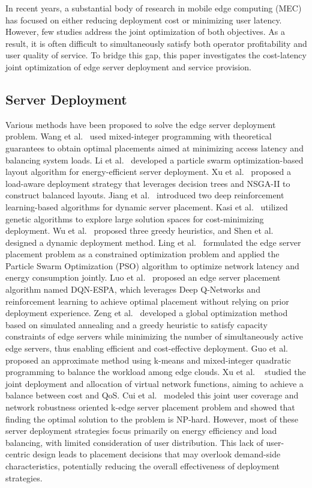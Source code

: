 \documentclass[10pt, conference, letterpaper]{IEEEtran}
\begin{document}
In recent years, a substantial body of research in mobile edge computing (MEC) has focused on either reducing deployment cost or minimizing user latency. However, few studies address the joint optimization of both objectives. As a result, it is often difficult to simultaneously satisfy both operator profitability and user quality of service. To bridge this gap, this paper investigates the cost-latency joint optimization of edge server deployment and service provision.

\subsection{Server Deployment}
Various methods have been proposed to solve the edge server deployment problem. Wang et al.~\cite{b1} used mixed-integer programming with theoretical guarantees to obtain optimal placements aimed at minimizing access latency and balancing system loads. Li et al.~\cite{b2} developed a particle swarm optimization-based layout algorithm for energy-efficient server deployment. Xu et al.~\cite{b3} proposed a load-aware deployment strategy that leverages decision trees and NSGA-II to construct balanced layouts. Jiang et al.~\cite{b4} introduced two deep reinforcement learning-based algorithms for dynamic server placement. Kasi et al.~\cite{b5} utilized genetic algorithms to explore large solution spaces for cost-minimizing deployment. Wu et al.~\cite{b6} proposed three greedy heuristics, and Shen et al.~\cite{b7} designed a dynamic deployment method. Ling et al.~\cite{b8} formulated the edge server placement problem as a constrained optimization problem and applied the Particle Swarm Optimization (PSO) algorithm to optimize network latency and energy consumption jointly. Luo et al.~\cite{b9} proposed an edge server placement algorithm named DQN-ESPA, which leverages Deep Q-Networks and reinforcement learning to achieve optimal placement without relying on prior deployment experience. Zeng et al.~\cite{b10} developed a global optimization method based on simulated annealing and a greedy heuristic to satisfy capacity constraints of edge servers while minimizing the number of simultaneously active edge servers, thus enabling efficient and cost-effective deployment. Guo et al.~\cite{b11} proposed an approximate method using k-means and mixed-integer quadratic programming to balance the workload among edge clouds. Xu et al. ~\cite{b12} studied the joint deployment and allocation of virtual network functions, aiming to achieve a balance between cost and QoS. Cui et al.~\cite{b13} modeled this joint user coverage and network robustness oriented k-edge server placement problem and showed that finding the optimal solution to the problem is NP-hard. However, most of these server deployment strategies focus primarily on energy efficiency and load balancing, with limited consideration of user distribution. This lack of user-centric design leads to placement decisions that may overlook demand-side characteristics, potentially reducing the overall effectiveness of deployment strategies.
\end{document}
